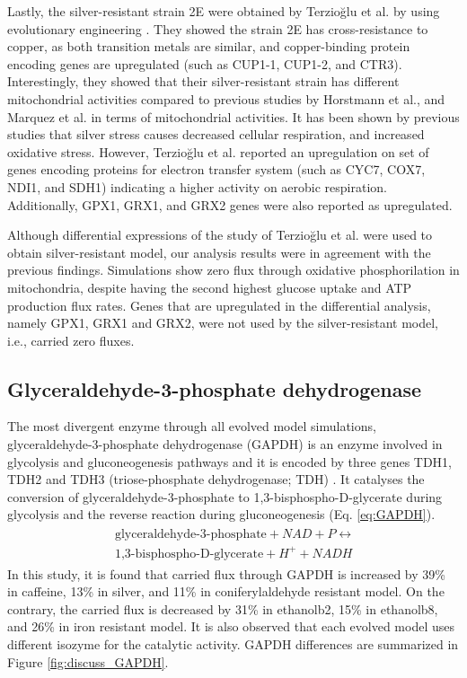 Lastly, the silver-resistant strain 2E were obtained by Terzioğlu et al. by using evolutionary engineering \cite{terziouglu2020genomic}. They showed the strain 2E has cross-resistance to copper, as both transition metals are similar, and copper-binding protein encoding genes are upregulated (such as CUP1-1, CUP1-2, and CTR3). Interestingly, they showed that their silver-resistant strain has different mitochondrial activities compared to previous studies by Horstmann et al.\cite{horstmann2019transcriptome}, and Marquez et al. \cite{galvan2018zinc} in terms of mitochondrial activities. It has been shown by previous studies that silver stress causes decreased cellular respiration, and increased oxidative stress. However, Terzioğlu et al. reported an upregulation on set of genes encoding proteins for electron transfer system (such as CYC7, COX7, NDI1, and SDH1) indicating a higher activity on aerobic respiration. Additionally, GPX1, GRX1, and GRX2 genes were also reported as upregulated.

Although differential expressions of the study of Terzioğlu et al. were used to obtain silver-resistant model, our analysis results were in agreement with the previous findings. Simulations show zero flux through oxidative phosphorilation in mitochondria, despite having the second highest glucose uptake and ATP production flux rates. Genes that are upregulated in the differential analysis, namely GPX1, GRX1 and GRX2, were not used by the silver-resistant model, i.e., carried zero fluxes.

\subsection{Glyceraldehyde-3-phosphate dehydrogenase}
The most divergent enzyme through all evolved model simulations, glyceraldehyde-3-phosphate dehydrogenase (GAPDH) is an enzyme involved in glycolysis and gluconeogenesis pathways and it is encoded by three genes TDH1, TDH2 and TDH3 (triose-phosphate dehydrogenase; TDH) \cite{boucherie1995differential}. It catalyses the conversion of glyceraldehyde-3-phosphate to 1,3-bisphospho-D-glycerate during glycolysis and the reverse reaction during gluconeogenesis (Eq. \ref{eq:GAPDH}).
\begin{align}
\label{eq:GAPDH}
\begin{split}
\ \text{glyceraldehyde-3-phosphate} + NAD + P \leftrightarrow \\
\ \text{1,3-bisphospho-D-glycerate} + H^+ + NADH
\end{split}
\end{align}
In this study, it is found that carried flux through GAPDH is increased by 39\% in caffeine, 13\% in silver, and 11\% in coniferylaldehyde resistant model. On the contrary, the carried flux is decreased by 31\% in ethanolb2, 15\% in ethanolb8, and 26\% in iron resistant model. It is also observed that each evolved model uses different isozyme for the catalytic activity. GAPDH differences are summarized in Figure \ref{fig:discuss_GAPDH}.

